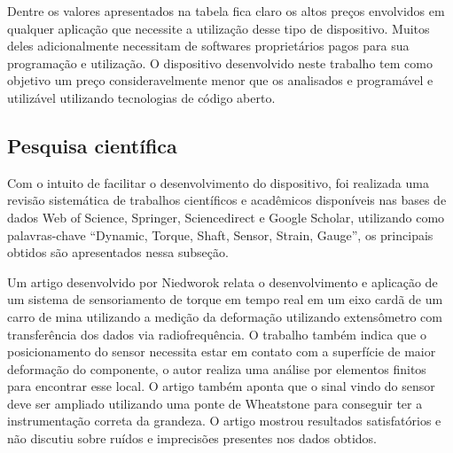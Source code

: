 \begin{table}[!ht]
    \caption{Comparação entre dispositivos encontrados}
    \label{tab:Banchmarking}
    \centering
\end{table}

Dentre os valores apresentados na tabela fica claro os altos preços envolvidos em qualquer aplicação que necessite a utilização desse tipo de dispositivo.
Muitos deles adicionalmente necessitam de softwares proprietários pagos para sua programação e utilização.
O dispositivo desenvolvido neste trabalho tem como objetivo um preço consideravelmente menor que os analisados e programável e utilizável utilizando tecnologias
de código aberto.

\subsection{Pesquisa científica}

Com o intuito de facilitar o desenvolvimento do dispositivo, foi realizada uma revisão sistemática de trabalhos científicos e acadêmicos disponíveis nas bases de dados Web of Science, Springer,
Sciencedirect e Google Scholar, utilizando como palavras-chave “Dynamic, Torque, Shaft, Sensor, Strain, Gauge”, os principais obtidos são apresentados nessa subseção.

Um artigo desenvolvido por Niedworok relata o desenvolvimento e aplicação de um sistema de sensoriamento de torque em tempo real em um eixo cardã de um carro de mina
utilizando a medição da deformação utilizando extensômetro com transferência dos dados via radiofrequência.
O trabalho também indica que o posicionamento do sensor necessita estar em contato com a superfície de maior deformação do componente, o autor realiza uma análise por elementos finitos
para encontrar esse local.
O artigo também aponta que o sinal vindo do sensor deve ser ampliado utilizando uma ponte de Wheatstone para conseguir ter a instrumentação correta da grandeza.
O artigo mostrou resultados satisfatórios e não discutiu sobre ruídos e imprecisões presentes nos dados obtidos. \autocite{Niedworok2014}

